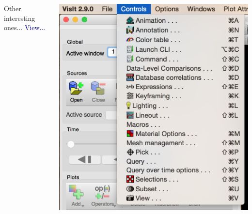 \begin{frame}
\begin{columns}
\begin{column}{6.5cm}
\begin{beamerboxesrounded}[upper=block head,lower=block body,shadow=true]{ Other interesting ones...}
		\hspace{2mm}
		 \textcolor{DarkBlue}{View...}
	\end{beamerboxesrounded}
\end{column}
\begin{column}{5.25cm}
	\centering
	\includegraphics[width=.85\columnwidth]{figs/visit-guis/visit_ctrls}
\end{column}
\end{columns}
\end{frame}
